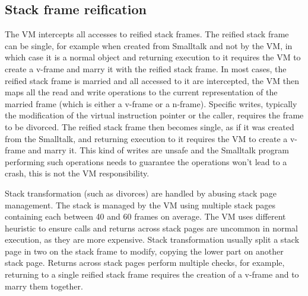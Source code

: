 \documentclass[a4paper,12pt,twoside]{../includes/ThesisStyle}
\begin{document}
\subsection{Stack frame reification}

The VM intercepts all accesses to reified stack frames. The reified stack frame can be single, for example when created from Smalltalk and not by the VM, in which case it is a normal object and returning execution to it requires the VM to create a v-frame and marry it with the reified stack frame. In most cases, the reified stack frame is married and all accessed to it are intercepted, the VM then maps all the read and write operations to the current representation of the married frame (which is either a v-frame or a n-frame). Specific writes, typically the modification of the virtual instruction pointer or the caller, requires the frame to be divorced. The reified stack frame then becomes single, as if it was created from the Smalltalk, and returning execution to it requires the VM to create a v-frame and marry it. This kind of writes are unsafe and the Smalltalk program performing such operations needs to guarantee the operations won't lead to a crash, this is not the VM responsibility. 

Stack transformation (such as divorces) are handled by abusing stack page management. The stack is managed by the VM using multiple stack pages containing each between 40 and 60 frames on average. The VM uses different heuristic to ensure calls and returns across stack pages are uncommon in normal execution, as they are more expensive. Stack transformation usually split a stack page in two on the stack frame to modify, copying the lower part on another stack page. Returns across stack pages perform multiple checks, for example, returning to a single reified stack frame requires the creation of a v-frame and to marry them together.


\ifx\wholebook\relax\else
    
\end{document}
